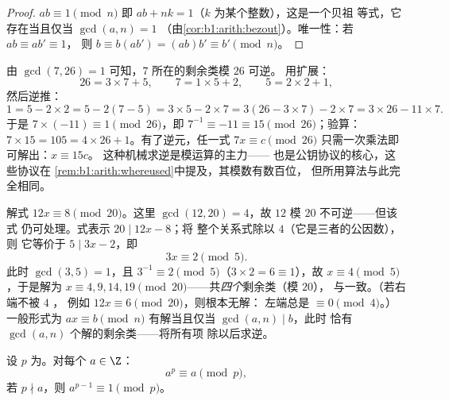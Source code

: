 \begin{proof}
$ab \equiv 1 \pmod n$ 即 $ab + nk = 1$（$k$ 为某个整数），这是一个贝祖
等式，它存在当且仅当 $\gcd(a,n) = 1$
（由\cref{cor:b1:arith:bezout}）。唯一性：若 $ab \equiv ab' \equiv 1$，
则 $b \equiv b(ab') = (ab)b' \equiv b' \pmod n$。
\end{proof}

\begin{example}[求 $7$ 模 $26$ 的逆元]\label{ex:b1:arith:inv7mod26}
由 $\gcd(7, 26) = 1$ 可知，$7$ 所在的剩余类模 $26$ 可逆。
用扩展：
\[
26 = 3 \times 7 + 5, \qquad
7 = 1 \times 5 + 2, \qquad
5 = 2 \times 2 + 1 ,
\]
然后逆推：
\[
1 = 5 - 2 \times 2 = 5 - 2(7 - 5) = 3 \times 5 - 2 \times 7
= 3(26 - 3 \times 7) - 2 \times 7 = 3 \times 26 - 11 \times 7 .
\]
于是 $7 \times (-11) \equiv 1 \pmod{26}$，即 $7^{-1} \equiv
-11 \equiv 15 \pmod{26}$；验算：$7 \times 15 = 105 = 4 \times 26
+ 1$。有了逆元，任一式 $7x \equiv c
\pmod{26}$ 只需一次乘法即可解出：$x \equiv 15c$。
这种机械求逆是模运算的主力——
也是公钥协议的核心，这些协议在
\cref{rem:b1:arith:whereused}中提及，其模数有数百位，
但所用算法与此完全相同。
\end{example}

\begin{example}[系数不可逆的情形]\label{ex:b1:arith:noninvertible}
解式 $12x \equiv 8 \pmod{20}$。这里 $\gcd(12, 20) = 4$，故 $12$
模 $20$ 不可逆——但该式
仍可处理。式表示 $20 \mid 12x - 8$；将
整个关系式除以 $4$（它是三者的公因数），则
它等价于 $5 \mid 3x - 2$，即
\[
3x \equiv 2 \pmod 5 .
\]
此时 $\gcd(3, 5) = 1$，且 $3^{-1} \equiv 2 \pmod 5$（$3 \times 2 =
6 \equiv 1$），故 $x \equiv 4 \pmod 5$，于是解为 $x
\equiv 4, 9, 14, 19 \pmod{20}$——共\emph{四个}剩余类（模 $20$），
与一致。（若右端不被 $4$ ，
例如 $12x \equiv 6 \pmod{20}$，则根本无解：
左端总是 $\equiv 0 \pmod 4$。）一般形式为 $ax
\equiv b \pmod n$ 有解当且仅当 $\gcd(a, n) \mid b$，此时
恰有 $\gcd(a, n)$ 个解的剩余类——将所有项
除以后求逆。
\end{example}

\begin{theorem}[费马小定理]\label{thm:b1:arith:fermat}
设 $p$ 为。对每个 $a \in \Z$：
\[
a^p \equiv a \pmod p,
\]
若 $p \nmid a$，则 $a^{p-1} \equiv 1 \pmod
p$。
\end{theorem}

